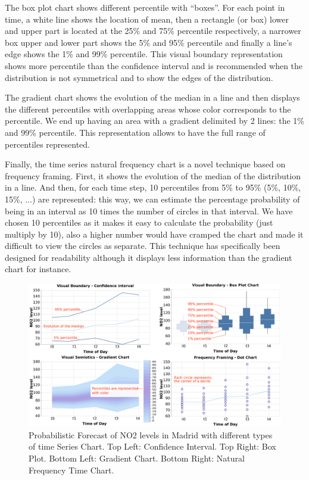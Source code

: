 \documentclass[a4paper,3p,sort&compress]{elsarticle}
\begin{document}
The box plot chart shows different percentile with “boxes”. For each point in time, a white 
line shows the location of mean, then a rectangle (or box) lower and upper part is located 
at the 25\% and 75\% percentile respectively, a narrower box upper and lower part shows 
the 5\% and 95\% percentile and finally a line’s edge shows the 1\% and 99\% percentile. 
This visual boundary representation shows more percentile than the confidence interval and 
is recommended when the distribution is not symmetrical and to show the edges of the distribution.

The gradient chart shows the evolution of the median in a line and then displays the different percentiles
with overlapping areas whose color corresponds to the percentile. We end up having an area with a gradient 
delimited by 2 lines: the 1\% and 99\% percentile. This representation allows to have the
 full range of percentiles represented.

Finally, the time series natural frequency chart is a novel technique based on frequency framing. First, 
it shows the evolution of the median of the distribution in a line. And then, for each time 
step, 10 percentiles from 5\% to 95\% (5\%, 10\%, 15\%, ...) are represented: this way, we can estimate the percentage 
probability of being in an interval as 10 times the number of circles in that interval. 
We have chosen 10 percentiles as it makes it easy to calculate the probability (just multiply by 10), also a higher number
would have cramped the chart and made it difficult to view the circles as separate. 
This technique has 
specifically been designed for readability although it displays less information than 
the gradient chart for instance. 


\begin{figure}
  \centering
  \includegraphics[width=.9\textwidth]{charts_vector} 
  \caption{\label{figure:charts} Probabilistic Forecast of NO2 levels in Madrid with different types of time Series Chart. 
  Top Left: Confidence Interval. Top Right: Box Plot. 
  Bottom Left: Gradient Chart. Bottom Right: Natural Frequency Time Chart. }
\end{figure} 
\end{document}

